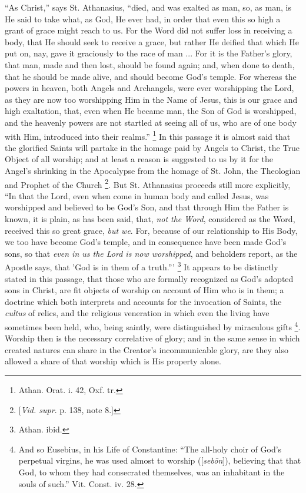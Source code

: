 ``As Christ,'' says St. Athanasius,
``died, and was exalted as man, so, as man, is He
said to take what, as God, He ever had, in order that
even this so high a grant of grace might reach to us. For
the Word did not suffer loss in receiving a body, that He
should seek to receive a grace, but rather He deified
that which He put on, nay, gave it graciously to the race
of man ... For it is the Father's glory, that man, made
and then lost, should be found again; and, when done to
death, that he should be made alive, and should become
God's temple. For whereas the powers in heaven, both
Angels and Archangels, were ever worshipping the Lord, as
they are now too worshipping Him in the Name of Jesus,
this is our grace and high exaltation, that, even when He
became man, the Son of God is worshipped, and the
heavenly powers are not startled at seeing all of us, who
are of one body with Him, introduced into their
realms.'' \footnote{Athan. Orat. i. 42, Oxf. tr.} In this passage it is almost said that the
glorified Saints will partake in the homage paid by
Angels to Christ, the True Object of all worship; and at
least a reason is suggested to us by it for the Angel's
shrinking in the Apocalypse from the homage of St. John,
the Theologian and Prophet of the Church \footnote{[\emph{Vid. supr}. p. 138, note 8.]}. But
St. Athanasius proceeds still more explicitly, ``In
that the Lord, even when come in human body and called
Jesus, was worshipped and believed to be God's Son, and
that through Him the Father is known, it is plain, as has
been said, that, \emph{not the Word}, considered as the
Word, received this so great grace, \emph{but we}. For,
because of our relationship to His Body, we too have
become God's temple, and in consequence have been made
God's sons, so that \emph{even in us the Lord is now worshipped},
and beholders report, as the Apostle says, that 'God is
in them of a truth.''' \footnote{Athan. ibid.} It appears to be distinctly
stated in this passage, that those who are formally
recognized as God's adopted sons in Christ, are fit
objects of worship on account of Him who is in them; a
doctrine which both interprets and accounts for the
invocation of Saints, the \emph{cultus} of relics, and
the religious veneration in which even the living have
sometimes been held, who, being saintly, were
distinguished by miraculous gifts \footnote{And so Eusebius, in his Life
of Constantine: ``The all-holy choir of God's
perpetual virgins, he was used almost to worship ([\emph{seb\={o}n}]),
believing that that God, to whom they had consecrated
themselves, was an inhabitant in the souls of such.''
Vit. Const. iv. 28.}. Worship then is the
necessary correlative of glory; and in the same sense in
which created natures can share in the Creator's
incommunicable glory, are they also allowed a share of
that worship which is His property alone.

